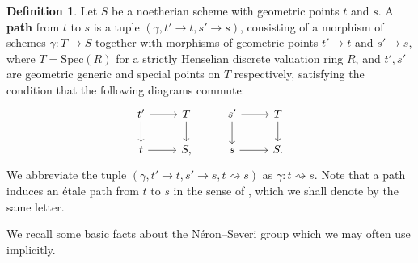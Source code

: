 \documentclass[11pt, letterpaper]{amsart}
\theoremstyle{plain}
\theoremstyle{definition}
\newtheorem{definition}[theorem]{Definition}
\newcommand{\Spec}{\mathrm{Spec}}
\newcommand{\<}{\langle}
\renewcommand{\>}{\rangle}
\begin{document}
\begin{definition}
\label{def: path}
    Let $S$ be a noetherian scheme with geometric points $t$ and $s$. 
    A \textbf{path} from $t$ to $s$ is a tuple $(\gamma, t' \to t, s' \to s)$, consisting of a morphism of schemes $\gamma : T \to S$ together with morphisms of geometric points $t' \to t$ and $s' \to s$, where $T = \Spec(R)$ for a strictly Henselian discrete valuation ring $R$, and $t', s'$ are geometric generic and special points on $T$ respectively, satisfying the condition that the following diagrams commute:
        \[\begin{tikzcd}
	{t'} & T & {s'} & T \\
	t & S, & s & S.
	\arrow[from=1-1, to=2-1]
	\arrow[from=1-1, to=1-2]
	\arrow[from=1-2, to=2-2]
	\arrow[from=2-1, to=2-2]
	\arrow[from=1-3, to=2-3]
	\arrow[from=1-3, to=1-4]
	\arrow[from=1-4, to=2-4]
	\arrow[from=2-3, to=2-4]
    \end{tikzcd}\]
    We abbreviate the tuple $(\gamma, t' \to t, s' \to s,  t \rightsquigarrow s)$ as $\gamma : t \rightsquigarrow s$. 
    Note that a path induces an \'etale path from $t$ to $s$ in the sense of \cite[\href{https://stacks.math.columbia.edu/tag/03VD}{Tag 03VD}]{stacks-project}, which we shall denote by the same letter. 
\end{definition}
We recall some basic facts about the N\'eron--Severi group which we may often use implicitly. 
\end{document}
